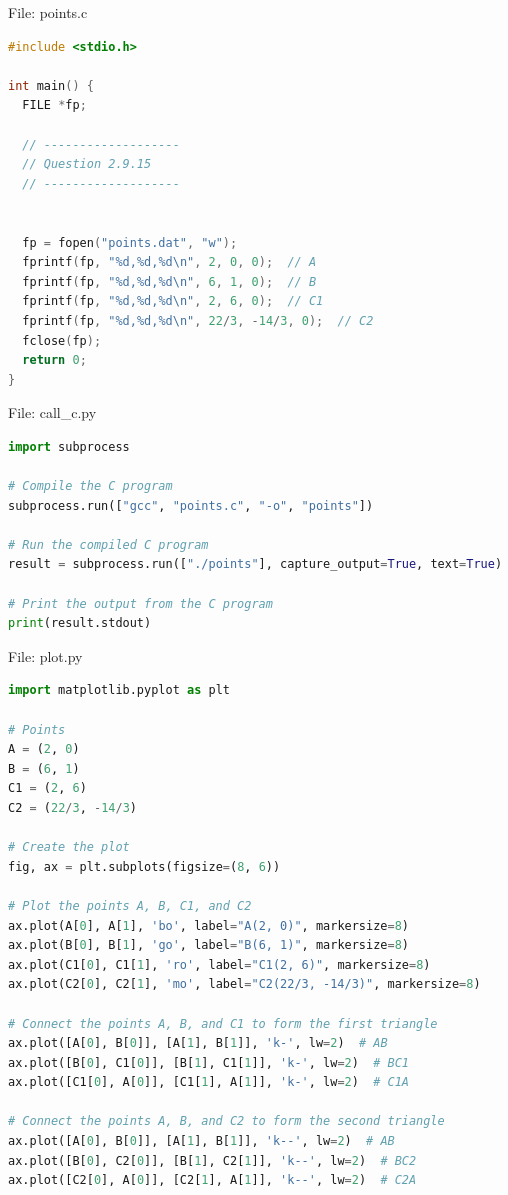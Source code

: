 \documentclass{beamer}
\numberwithin{equation}{section}
\theoremstyle{remark}
\begin{document}
\begin{frame}[fragile]{File: points.c}
\begin{lstlisting}[language=C]
#include <stdio.h>

int main() {
  FILE *fp;

  // -------------------
  // Question 2.9.15
  // -------------------


  fp = fopen("points.dat", "w");
  fprintf(fp, "%d,%d,%d\n", 2, 0, 0);  // A
  fprintf(fp, "%d,%d,%d\n", 6, 1, 0);  // B
  fprintf(fp, "%d,%d,%d\n", 2, 6, 0);  // C1
  fprintf(fp, "%d,%d,%d\n", 22/3, -14/3, 0);  // C2
  fclose(fp);
  return 0;
}
\end{lstlisting}
\end{frame}

\begin{frame}[fragile]{File: call\_c.py}
\begin{lstlisting}[language=Python]
import subprocess

# Compile the C program
subprocess.run(["gcc", "points.c", "-o", "points"])

# Run the compiled C program
result = subprocess.run(["./points"], capture_output=True, text=True)

# Print the output from the C program
print(result.stdout)
\end{lstlisting}
\end{frame}

\begin{frame}[fragile]{File: plot.py}
\begin{lstlisting}[language=Python]
import matplotlib.pyplot as plt

# Points
A = (2, 0)
B = (6, 1)
C1 = (2, 6)
C2 = (22/3, -14/3)

# Create the plot
fig, ax = plt.subplots(figsize=(8, 6))

# Plot the points A, B, C1, and C2
ax.plot(A[0], A[1], 'bo', label="A(2, 0)", markersize=8)
ax.plot(B[0], B[1], 'go', label="B(6, 1)", markersize=8)
ax.plot(C1[0], C1[1], 'ro', label="C1(2, 6)", markersize=8)
ax.plot(C2[0], C2[1], 'mo', label="C2(22/3, -14/3)", markersize=8)

# Connect the points A, B, and C1 to form the first triangle
ax.plot([A[0], B[0]], [A[1], B[1]], 'k-', lw=2)  # AB
ax.plot([B[0], C1[0]], [B[1], C1[1]], 'k-', lw=2)  # BC1
ax.plot([C1[0], A[0]], [C1[1], A[1]], 'k-', lw=2)  # C1A

# Connect the points A, B, and C2 to form the second triangle
ax.plot([A[0], B[0]], [A[1], B[1]], 'k--', lw=2)  # AB
ax.plot([B[0], C2[0]], [B[1], C2[1]], 'k--', lw=2)  # BC2
ax.plot([C2[0], A[0]], [C2[1], A[1]], 'k--', lw=2)  # C2A
\end{lstlisting}
\end{frame}
\end{document}
